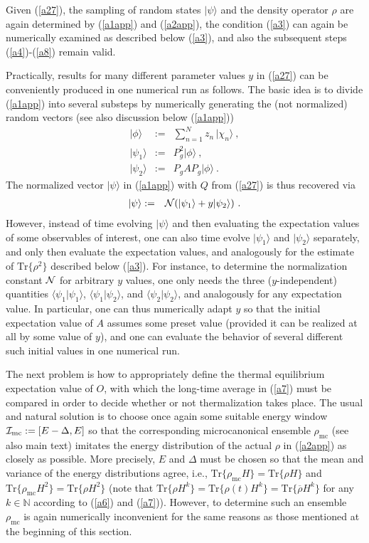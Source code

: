 \documentclass[twocolumn,aps,prb,floatfix,superscriptaddress]{revtex4-2}
\newcommand{\<}{\left\langle}	%
\renewcommand{\>}{\right\rangle}	%
\newcommand{\Imc}{{\cal I}_{\mathrm{mc}}}
\newcommand{\NN}{{\mathbb N}}
\newcommand{\pu}{\tr\{\rho^2\}}
\newcommand{\Pg}{P_{\! g}}
\newcommand{\tr}{\mbox{Tr}}
\newcommand{\rhomic}{\rho_{\mathrm{mc}}}
\begin{document}
Given (\ref{a27}), the sampling of random states
$|\psi\rangle$ and the density operator $\rho$
are again determined by (\ref{a1app}) and (\ref{a2app}),
the condition (\ref{a3}) can again be numerically
examined as described below (\ref{a3}),
and also the subsequent steps (\ref{a4})-(\ref{a8})
remain valid. 

Practically, results for many different parameter 
values $y$ in (\ref{a27}) can be conveniently 
produced in one numerical run as follows.
The basic idea is to divide (\ref{a1app}) into
several substeps by numerically 
generating the (not normalized) random 
vectors (see also discussion below (\ref{a1app}))
\begin{eqnarray}
|\phi\rangle & := & \sum_{n=1}^N z_n \, |\chi_n\rangle
\ ,
\label{y2}
\\
|\psi_1\rangle & := & P_g^2|\phi\rangle
\ ,
\label{y3}
\\
|\psi_2\rangle & := & P_gA\Pg |\phi\rangle
\ .
\label{y4}
\end{eqnarray}
The normalized vector $|\psi\rangle$ in (\ref{a1app}) with $Q$ from
(\ref{a27}) is thus recovered via
\begin{eqnarray}
|\psi\rangle & := & {\cal{N}} (|\psi_1\rangle + y |\psi_2\rangle)
\ .
\label{y5}
\end{eqnarray}
However, instead of time evolving $|\psi\rangle$ 
and then evaluating the expectation values of some
observables of interest, one can also time evolve
$|\psi_1\rangle$ and $|\psi_2\rangle$ separately,
and only then evaluate the expectation values,
and analogously for the estimate of $\pu$
described below (\ref{a3}).
For instance, to determine the normalization 
constant ${\cal N}$ for arbitrary $y$ values, 
one only needs the three ($y$-independent)
quantities $\langle\psi_1|\psi_1\rangle$,
$\langle\psi_1|\psi_2\rangle$, and
$\langle\psi_2|\psi_2\rangle$,
and analogously for any expectation value.
In particular, one can thus numerically 
adapt $y$ so that
the initial expectation value of $A$ assumes
some preset value (provided it can be realized 
at all by some value of $y$),
and one can evaluate the behavior of 
several different such initial values 
in one numerical run.

The next problem is how to appropriately 
define the thermal equilibrium expectation 
value of $O$, with which the long-time average
in (\ref{a7}) must be compared in order to 
decide whether or not thermalization 
takes place.
The usual and natural solution is to choose once again
some suitable energy window 
$\Imc:=[E-\Delta,E]$ 
so that the corresponding microcanonical
ensemble $\rhomic$ (see also main text) 
imitates the energy distribution of the actual 
$\rho$ in (\ref{a2app}) as closely as possible. 
More precisely, $E$ and $\Delta$
must be chosen so that the mean and 
variance of the energy distributions agree,
i.e., $\tr\{\rhomic H\}=\tr\{\rho H\}$ and 
$\tr\{\rhomic H^2\}=\tr\{\rho H^2\}$
(note that $\tr\{\rho H^k\}=\tr\{\rho(t) H^k\}
=\tr\{\overline{\rho} H^k\}$
for any $k\in\NN$ according to 
(\ref{a6}) and (\ref{a7})).
However, to determine such an ensemble
$\rhomic$ is again numerically inconvenient
for the same reasons as those mentioned 
at the beginning of this section.
\end{document}
